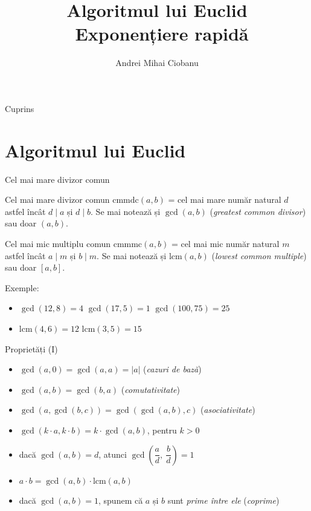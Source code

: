 ﻿\documentclass{beamer}
\title{Algoritmul lui Euclid \textbar\ Exponențiere rapidă}
\subtitle{}
\author{Andrei Mihai Ciobanu}
\institute{Algolymp Summer School}
\date{}
\begin{document}
\begin{frame}
  \titlepage
\end{frame}

\begin{frame}{Cuprins}
  \tableofcontents
\end{frame}

\section{Algoritmul lui Euclid}

\begin{frame}{Cel mai mare divizor comun}
  \begin{block}{Cel mai mare divizor comun}
    $\text{cmmdc}(a, b)$ = cel mai mare număr natural $d$ astfel încât $d \mid a$ și $d \mid b$. Se mai notează și $\gcd(a, b)$ (\textit{greatest common divisor}) sau doar $(a, b)$.
  \end{block}
  \bigskip
  \begin{block}{Cel mai mic multiplu comun}
    $\text{cmmmc}(a, b)$ = cel mai mic număr natural $m$ astfel încât $a \mid m$ și $b \mid m$. Se mai notează și $\text{lcm}(a, b)$ (\textit{lowest common multiple}) sau doar $[a, b]$.
  \end{block}
  \bigskip
  Exemple:
  \begin{itemize}
    \item $\gcd(12, 8) = 4$ \quad $\gcd(17, 5) = 1$ \quad $\gcd(100, 75) = 25$
    \item $\text{lcm}(4, 6) = 12$ \quad $\text{lcm}(3, 5) = 15$
  \end{itemize}
\end{frame}

\begin{frame}{Proprietăți (I)}
  \begin{itemize}
    \item $\gcd(a, 0) = \gcd(a, a) = |a|$ \quad \quad (\textit{cazuri de bază})
    \item $\gcd(a, b) = \gcd(b, a)$ \quad (\textit{comutativitate})
    \item $\gcd(a, \gcd(b, c)) = \gcd(\gcd(a, b), c)$ \quad (\textit{asociativitate})
    \item $\gcd(k \cdot a, k \cdot b) = k \cdot \gcd(a, b)$, pentru $k > 0$
    \item dacă $\gcd(a, b) = d$, atunci $\gcd\!\left(\dfrac{a}{d},\ \dfrac{b}{d}\right) = 1$
    \item $a \cdot b = \gcd(a, b) \cdot \text{lcm}(a, b)$
    \item dacă $\gcd(a, b) = 1$, spunem că $a$ și $b$ sunt \textit{prime între ele} (\textit{coprime})
  \end{itemize}
\end{frame}
\end{document}

